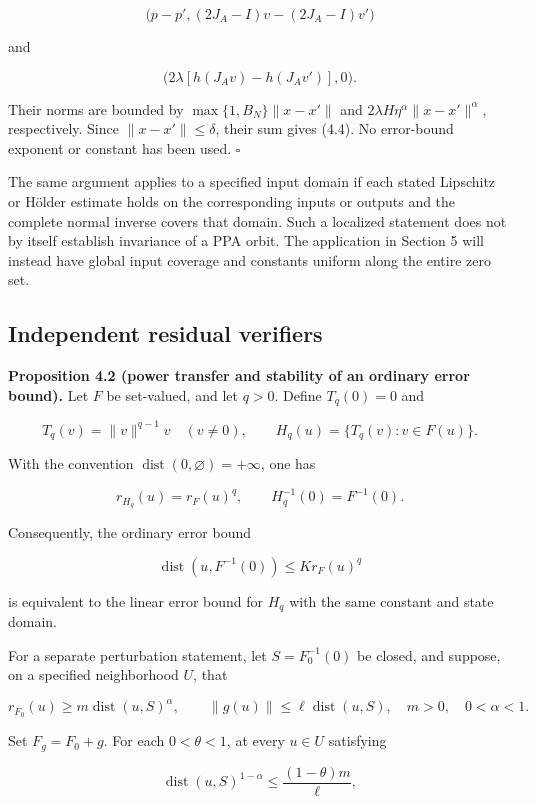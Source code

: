 \documentclass[11pt,a4paper]{article}
\theoremstyle{plain}
\theoremstyle{definition}
\theoremstyle{remark}
\begin{document}
\[
\bigl(p-p',(2J_A-I)v-(2J_A-I)v'\bigr)
\]

and

\[
\bigl(2\lambda[h(J_Av)-h(J_Av')],0\bigr).
\]

Their norms are bounded by \(\max\{1,B_N\}\|x-x'\|\) and
\(2\lambda H\eta^\alpha\|x-x'\|^\alpha\), respectively. Since
\(\|x-x'\|\le\delta\), their sum gives (4.4). No error-bound exponent or
constant has been used. \(\square\)

The same argument applies to a specified input domain if each stated
Lipschitz or Hölder estimate holds on the corresponding inputs or
outputs and the complete normal inverse covers that domain. Such a
localized statement does not by itself establish invariance of a PPA
orbit. The application in Section 5 will instead have global input
coverage and constants uniform along the entire zero set.

\hypertarget{independent-residual-verifiers}{%
\subsection{Independent residual
verifiers}\label{independent-residual-verifiers}}

\textbf{Proposition 4.2 (power transfer and stability of an ordinary
error bound).} Let \(F\) be set-valued, and let \(q>0\). Define
\(T_q(0)=0\) and

\[
T_q(v)=\|v\|^{q-1}v\quad(v\ne0),\qquad
H_q(u)=\{T_q(v):v\in F(u)\}.
\tag{4.5}
\]

With the convention \(\operatorname{dist}(0,\varnothing)=+\infty\), one
has

\[
r_{H_q}(u)=r_F(u)^q,\qquad H_q^{-1}(0)=F^{-1}(0).
\tag{4.6}
\]

Consequently, the ordinary error bound

\[
\operatorname{dist}(u,F^{-1}(0))\le K r_F(u)^q
\tag{4.7}
\]

is equivalent to the linear error bound for \(H_q\) with the same
constant and state domain.

For a separate perturbation statement, let \(S=F_0^{-1}(0)\) be closed,
and suppose, on a specified neighborhood \(U\), that

\[
r_{F_0}(u)\ge m\operatorname{dist}(u,S)^\alpha,
\qquad
\|g(u)\|\le\ell\operatorname{dist}(u,S),
\quad m>0,\quad 0<\alpha<1.
\tag{4.8}
\]

Set \(F_g=F_0+g\). For each \(0<\theta<1\), at every \(u\in U\)
satisfying

\[
\operatorname{dist}(u,S)^{1-\alpha}
\le\frac{(1-\theta)m}{\ell},
\tag{4.9}
\]
\end{document}
